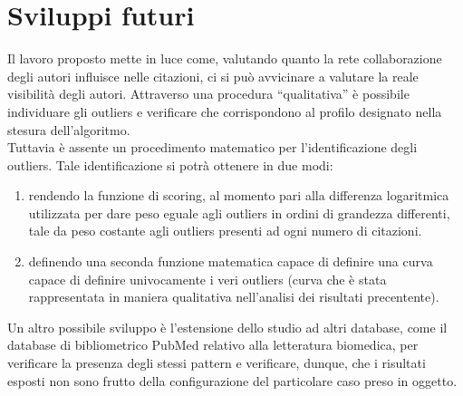 \documentclass[a4paper, 12pt]{article}
\let\oldsection\section
\renewcommand\section{\clearpage\oldsection}
\begin{document}
\section{Sviluppi futuri}
Il lavoro proposto mette in luce come, valutando quanto la rete collaborazione degli autori influisce nelle citazioni, ci si può avvicinare a valutare la reale visibilità degli autori.
Attraverso una procedura ``qualitativa'' è possibile individuare gli outliers e verificare che corrispondono al profilo designato nella stesura dell'algoritmo. \\
Tuttavia è assente un procedimento matematico per l'identificazione degli outliers. Tale identificazione si potrà ottenere in due modi: \begin{enumerate}
  \item rendendo la funzione di scoring, al momento pari alla differenza logaritmica utilizzata per dare peso eguale agli outliers in ordini di grandezza differenti, tale da peso costante agli outliers presenti ad ogni numero di citazioni.
  \item definendo una seconda funzione matematica capace di definire una  curva capace di definire univocamente i veri outliers (curva che è stata rappresentata in maniera qualitativa nell'analisi dei risultati precentente).
\end{enumerate}
Un altro possibile sviluppo è l'estensione dello studio ad altri database, come il database di bibliometrico PubMed relativo alla letteratura biomedica, per verificare la presenza degli stessi pattern e verificare, dunque, che i risultati esposti non sono frutto della configurazione del particolare caso preso in oggetto.




\end{document}
